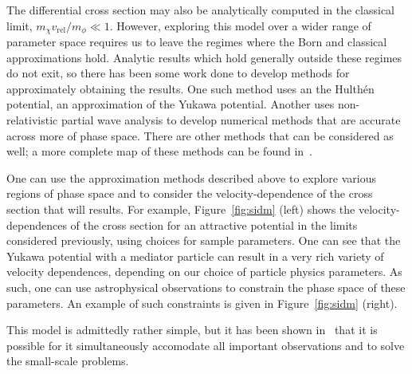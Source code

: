 The differential cross section may also be analytically computed in the
classical limit, $m_\chi v_{\text{rel}} / m_\phi \ll 1$. However, exploring this
model over a wider range of parameter space requires us to leave the regimes
where the Born and classical approximations hold. Analytic results which hold
generally outside these regimes do not exit, so there has been some work done to
develop methods for approximately obtaining the results. One such method uses an
the Hulthén potential, an approximation of the Yukawa potential. Another uses
non-relativistic partial wave analysis to develop numerical methods that are
accurate across more of phase space. There are other methods that can be
considered as well; a more complete map of these methods can be found
in~\cite{tulin_beyond_2013}.

One can use the approximation methods described above to explore various regions
of phase space and to consider the velocity-dependence of the cross section that
will results. For example, Figure~\ref{fig:sidm} (left) shows the
velocity-dependences of the cross section for an attractive potential in the
limits considered previously, using choices for sample parameters. One can
see that the Yukawa potential with a mediator particle can result in a very
rich variety of velocity dependences, depending on our choice of particle
physics parameters. As such, one can use astrophysical observations to
constrain the phase space of these parameters. An example of such constraints
is given in Figure~\ref{fig:sidm} (right).

This model is admittedly rather simple, but it has been shown
in~\cite{tulin_beyond_2013} that it is possible for it simultaneously
accomodate all important observations and to solve the small-scale problems.

